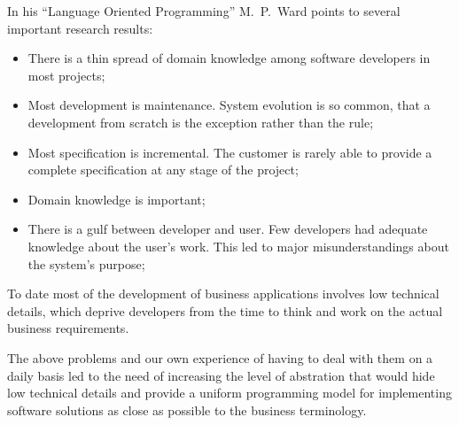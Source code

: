   In his ``Language Oriented Programming'' M.~P.~Ward points to several important research results:
  \begin{itemize}
    \item There is a thin spread of domain knowledge among software developers in most projects;    
    \item Most development is maintenance. 
	  System evolution is so common, that a development from scratch is the exception rather than the rule;
    \item Most specification is incremental. 
	  The customer is rarely able to provide a complete specification at any stage of the project;
    \item Domain knowledge is important;
    \item There is a gulf between developer and user. 
	  Few developers had adequate knowledge about the user’s work. 
	  This led to major misunderstandings about the system’s purpose;
  \end{itemize}
  
  To date most of the development of business applications involves low technical details, which deprive developers from the time to think and work on the actual business requirements.
  
  The above problems and our own experience of having to deal with them on a daily basis led to the need of increasing the level of abstration that would hide low technical details and provide a uniform programming model for implementing software solutions as close as possible to the business terminology.
